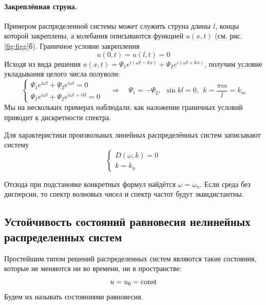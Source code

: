 \paragraph{Закреплённая струна. } Примером распределенной системы может служить струна длины $l$, концы которой закреплены, а колебания описываются функцией $u(x,t)$ (см. рис. \ref{fig:figg}б). Граничное условие закрепления
\begin{equation*}
	u(0,t)=u(l,t)=0
\end{equation*}
Исходя из вида решения $u(x,t)=\Psi_1 e^{i(\omega t-kx)}+\Psi_2 e^{i(\omega t+kx)}$, получим условие укладывания целого числа полуволн:
\begin{equation*}
	\begin{cases}
		\Psi_1 e^{i\omega t}+\Psi_2 e^{i\omega t}=0 \\
		\Psi_1 e^{i\omega t}+\Psi_2 e^{i\omega t+ikl}=0
	\end{cases} \quad\Rightarrow\quad 
	\Psi_1=-\Psi_2,~~ \sin{kl}=0,~~ k=\frac{\pi m}{l}=k_m
\end{equation*}
Мы на нескольких примерах наблюдали, как наложение граничных условий приводит к дискретности спектра. 

Для характеристики произвольных линейных распределённых систем записывают систему
\begin{equation}
	\begin{cases}
		D(\omega,k)=0 \\
		k=k_n
	\end{cases}
	\label{eq:15}
\end{equation}

Отсюда при подстановке конкретных формул найдётся $\omega=\omega_n$. Если среда без дисперсии, то спектр волновых чисел и спектр частот будут эквидистантны. 





\subsection{Устойчивость состояний равновесия нелинейных распределенных систем}
Простейшим типом решений распределенных систем являются такие состояния, которые не меняются ни во времени, ни в пространстве: 
\begin{equation*}
	u=u_0 = \textrm{const}
\end{equation*}
Будем их называть состояниями равновесия.

